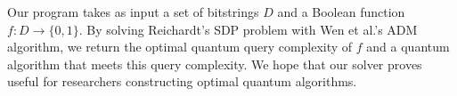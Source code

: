 Our program takes as input a set of bitstrings $D$
and a Boolean function $f: D \rightarrow \{0,1\}$. 
By solving Reichardt's SDP problem with
Wen et al.'s ADM algorithm,
we return the optimal quantum query complexity of $f$
and a quantum algorithm that meets this query complexity.
We hope that our solver proves useful
for researchers constructing optimal quantum algorithms.
